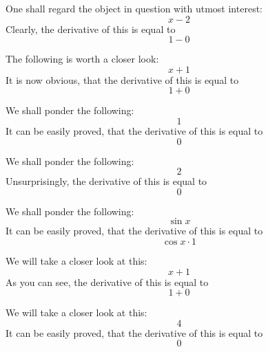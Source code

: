 \documentclass{article}
\begin{document}
One shall regard the object in question with utmost interest:
\begin{equation}
x - 2 
\end{equation}
Clearly, the derivative of this is equal to
\begin{equation}
1 - 0 
\end{equation}

The following is worth a closer look:
\begin{equation}
x + 1 
\end{equation}
It is now obvious, that the derivative of this is equal to
\begin{equation}
1 + 0 
\end{equation}

We shall ponder the following:
\begin{equation}
1 
\end{equation}
It can be easily proved, that the derivative of this is equal to
\begin{equation}
0 
\end{equation}

We shall ponder the following:
\begin{equation}
2 
\end{equation}
Unsurprisingly, the derivative of this is equal to
\begin{equation}
0 
\end{equation}

We shall ponder the following:
\begin{equation}
\sin x 
\end{equation}
It can be easily proved, that the derivative of this is equal to
\begin{equation}
\cos x \cdot 1 
\end{equation}

We will take a closer look at this:
\begin{equation}
x + 1 
\end{equation}
As you can see, the derivative of this is equal to
\begin{equation}
1 + 0 
\end{equation}

We will take a closer look at this:
\begin{equation}
4 
\end{equation}
It can be easily proved, that the derivative of this is equal to
\begin{equation}
0 
\end{equation}
\end{document}
